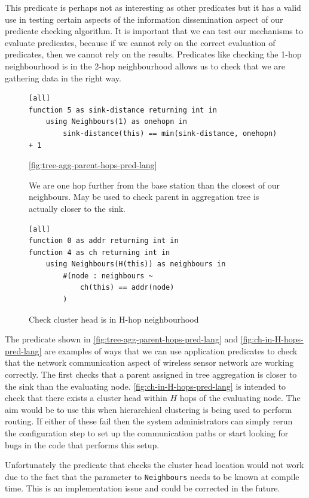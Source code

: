 This predicate is perhaps not as interesting as other predicates but it has a valid use in testing certain aspects of the information dissemination aspect of our predicate checking algorithm. It is important that we can test our mechanisms to evaluate predicates, because if we cannot rely on the correct evaluation of predicates, then we cannot rely on the results. Predicates like checking the 1-hop neighbourhood is in the 2-hop neighbourhood allows us to check that we are gathering data in the right way.


\begin{figure}[H]
\begin{verbatim}
[all]
function 5 as sink-distance returning int in
    using Neighbours(1) as onehopn in
        sink-distance(this) == min(sink-distance, onehopn) + 1
\end{verbatim}
\caption{We are one hop further from the base station than the closest of our neighbours. May be used to check parent in aggregation tree is actually closer to the sink.}
\autoref{fig:tree-agg-parent-hops-pred-lang}
\end{figure}

\begin{figure}[H]
\begin{verbatim}
[all]
function 0 as addr returning int in
function 4 as ch returning int in
    using Neighbours(H(this)) as neighbours in
        #(node : neighbours ~
            ch(this) == addr(node)
        )
\end{verbatim}
\caption{Check cluster head is in H-hop neighbourhood}
\label{fig:ch-in-H-hops-pred-lang}
\end{figure}

The predicate shown in \autoref{fig:tree-agg-parent-hops-pred-lang} and \autoref{fig:ch-in-H-hops-pred-lang} are examples of ways that we can use application predicates to check that the network communication aspect of wireless sensor network are working correctly. The first checks that a parent assigned in tree aggregation is closer to the sink than the evaluating node. \autoref{fig:ch-in-H-hops-pred-lang} is intended to check that there exists a cluster head within $H$ hops of the evaluating node. The aim would be to use this when hierarchical clustering is being used to perform routing. If either of these fail then the system administrators can simply rerun the configuration step to set up the communication paths or start looking for bugs in the code that performs this setup.

Unfortunately the predicate that checks the cluster head location would not work due to the fact that the parameter to \verb|Neighbours| needs to be known at compile time. This is an implementation issue and could be corrected in the future.


